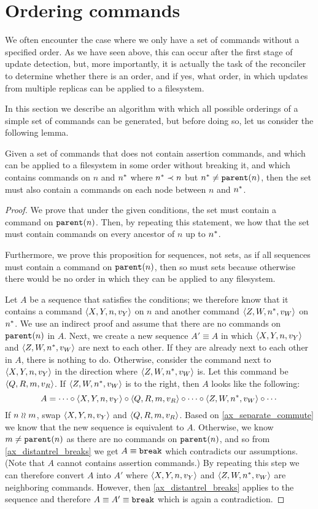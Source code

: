 
\section{Ordering commands}\label{ordering}

We often encounter the case where we only have a set of commands without a specified order.
As we have seen above, this can occur after the first stage of update detection,
but, more importantly,
it is actually the task of the reconciler to determine whether there is an order,
and if yes, what order,
in which updates from multiple replicas can be applied to a filesystem.

In this section we describe an algorithm with which all possible orderings of a
simple set of commands can be generated, but before doing so, let us consider the following lemma.

\begin{mylem}\label{connected_changes}
Given a set of commands that
does not contain assertion commands,
and which can be applied to a filesystem in some order without breaking it,
and which contains commands on $n$ and $n^*$ where $n^*\prec n$
but $n^*\neq\mathtt{parent}(n)$, then the set must also contain a commands
on each node between $n$ and $n^*$.
\end{mylem}
\begin{proof}
We prove that under the given conditions, the set must contain a command on $\mathtt{parent}(n)$.
Then, by repeating this statement, we how that the set must contain commands on every
ancestor of $n$ up to $n^*$.

Furthermore,
we prove this proposition for sequences, not sets, as if all sequences must contain a command on $\mathtt{parent}(n)$,
then so must sets because otherwise there would be no order in which they can be
applied to any filesystem.

Let $A$ be a sequence that satisfies the conditions;
we therefore know that it contains a command $\langle{X,Y,n,v_Y}\rangle$ on $n$
and another command $\langle{Z,W,n^*,v_W}\rangle$ on $n^*$.
We use an indirect proof and assume that there are no commands on $\mathtt{parent}(n)$ in $A$.
Next, we create a new sequence $A'\equiv A$ in which $\langle{X,Y,n,v_Y}\rangle$ and $\langle{Z,W,n^*,v_W}\rangle$ are next to each other.
If they are already next to each other in $A$, there is nothing to do.
Otherwise, consider the command next to $\langle{X,Y,n,v_Y}\rangle$ in the direction where $\langle{Z,W,n^*,v_W}\rangle$ is.
Let this command be $\langle{Q,R,m,v_R}\rangle$.
If $\langle{Z,W,n^*,v_W}\rangle$ is to the right, then $A$ looks like the following:
\[ A = \cdots\circ\langle{X,Y,n,v_Y}\rangle\circ\langle{Q,R,m,v_R}\rangle\circ\cdots\circ\langle{Z,W,n^*,v_W}\rangle\circ\cdots \]
If $n\mathrel{\wr\wr} m$, swap $\langle{X,Y,n,v_Y}\rangle$ and $\langle{Q,R,m,v_R}\rangle$. Based on \cref{ax_separate_commute} we know that the new
sequence is equivalent to $A$.
Otherwise, we know $m\neq\mathtt{parent}(n)$ as there are no commands on $\mathtt{parent}(n)$, and so
from \cref{ax_distantrel_breaks} we get $A\equiv\mathtt{break}$ which contradicts our assumptions.
(Note that $A$ cannot contains assertion commands.)
By repeating this step we can therefore convert $A$ into $A'$ where $\langle{X,Y,n,v_Y}\rangle$ and $\langle{Z,W,n^*,v_W}\rangle$ are neighboring commands.
However, then \cref{ax_distantrel_breaks} applies to the sequence and therefore $A\equiv A'\equiv\mathtt{break}$ which
is again a contradiction.
\end{proof}

